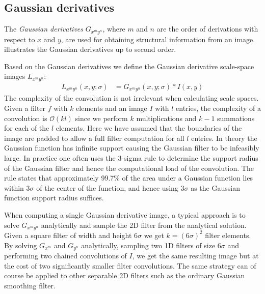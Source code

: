 \documentclass[thesis.tex]{subfiles}
\begin{document}
\subsection{Gaussian derivatives}
\label{sec:gaussianDerivatives}

The \emph{Gaussian derivatives} $G_{x^m y^n}$, where $m$ and $n$ are the order of derivations with respect to $x$ and $y$, are used for obtaining structural information from an image.  illustrates the Gaussian derivatives up to second order.

Based on the Gaussian derivatives we define the Gaussian derivative scale-space images $L_{x^m y^n}$:
\begin{align}
	L_{x^m y^n}(x,y;\sigma) &= G_{x^m y^n}(x,y;\sigma) \ast I(x,y)
\end{align}
%
The complexity of the convolution is not irrelevant when calculating scale spaces. Given a filter $f$ with $k$ elements and an image $I$ with $l$ entries, the complexity of a convolution is $\mathcal{O}(k l)$ since we perform $k$ multiplications and $k-1$ summations for each of the $l$ elements. Here we have assumed that the boundaries of the image are padded to allow a full filter computation for all $l$ entries.
In theory the Gaussian function has infinite support causing the Gaussian filter to be infeasibly large. In practice one often uses the 3-sigma rule to determine the support radius of the Gaussian filter and hence the computational load of the convolution. The rule states that approximately 99.7\% of the area under a Gaussian function lies within 3$\sigma$ of the center of the function, and hence using $3\sigma$ as the Gaussian function support radius suffices.

When computing a single Gaussian derivative image, a typical approach is to solve $G_{x^m y^n}$ analytically and sample the 2D filter from the analytical solution. Given a square filter of width and height $6\sigma$ we get $k=(6\sigma)^2$ filter elements. By solving $G_{x^m}$ and $G_{y^n}$ analytically, sampling two 1D filters of size $6\sigma$ and performing two chained convolutions of $I$, we get the same resulting image but at the cost of two significantly smaller filter convolutions. The same strategy can of course be applied to other separable 2D filters such as the ordinary Gaussian smoothing filter.
\end{document}
